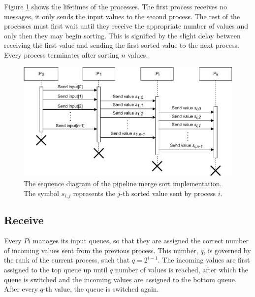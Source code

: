 \documentclass[pdftex, 11pt, a4paper, titlepage]{article}
\begin{document}
        Figure \ref{sequence_diagram} shows the lifetimes of the processes. The first process receives no messages,
        it only sends the input values to the second process. The rest of the processes must first wait until they
        receive the appropriate number of values and only then they may begin sorting. This is signified by the slight delay
        between receiving the first value and sending the first sorted value to the next process. Every process terminates
        after sorting $n$ values.

        \begin{figure}[h]
            \centering
            \includegraphics[scale=0.8]{sequence_diagram.pdf}
            \caption{The sequence diagram of the pipeline merge sort implementation. The symbol $s_{i,j}$ represents
            the $j$-th sorted value sent by process $i$.}
            \label{sequence_diagram}
        \end{figure}

        \subsection*{Receive}
        Every $Pi$ manages its input queues,
        so that they are assigned the correct number of incoming values sent from the previous process. This number, $q$, is
        governed by the rank of the current process, such that $q = 2^{i-1}$. The incoming values are first assigned to the
        top queue up until $q$ number of values is reached, after which the queue is switched and the incoming values are
        assigned to the bottom queue. After every $q$-th value, the queue is switched again.
\end{document}
